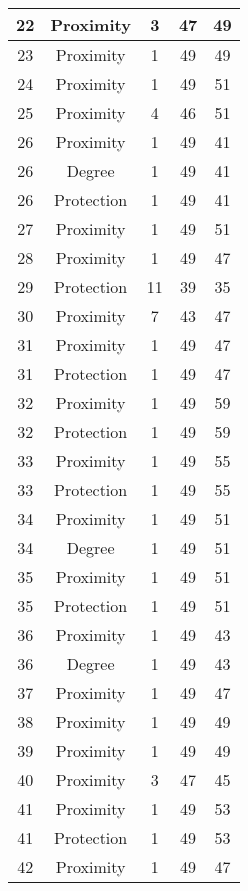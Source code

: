 \documentclass[results.tex]{subfiles}
\begin{document}
\begin{center}
\begin{tabular}{| c || c | c | c | c |}
    \hline
    22 & Proximity & 3 & 47 & 49 \\ 
    \hline
    23 & Proximity & 1 & 49 & 49 \\ 
    \hline
    24 & Proximity & 1 & 49 & 51 \\ 
    \hline
    25 & Proximity & 4 & 46 & 51 \\ 
    \hline
    26 & Proximity & 1 & 49 & 41 \\ 
    \hline
    26 & Degree & 1 & 49 & 41 \\ 
    \hline
    26 & Protection & 1 & 49 & 41 \\ 
    \hline
    27 & Proximity & 1 & 49 & 51 \\ 
    \hline
    28 & Proximity & 1 & 49 & 47 \\ 
    \hline
    29 & Protection & 11 & 39 & 35 \\ 
    \hline
    30 & Proximity & 7 & 43 & 47 \\ 
    \hline
    31 & Proximity & 1 & 49 & 47 \\ 
    \hline
    31 & Protection & 1 & 49 & 47 \\ 
    \hline
    32 & Proximity & 1 & 49 & 59 \\ 
    \hline
    32 & Protection & 1 & 49 & 59 \\ 
    \hline
    33 & Proximity & 1 & 49 & 55 \\ 
    \hline
    33 & Protection & 1 & 49 & 55 \\ 
    \hline
    34 & Proximity & 1 & 49 & 51 \\ 
    \hline
    34 & Degree & 1 & 49 & 51 \\ 
    \hline
    35 & Proximity & 1 & 49 & 51 \\ 
    \hline
    35 & Protection & 1 & 49 & 51 \\ 
    \hline
    36 & Proximity & 1 & 49 & 43 \\ 
    \hline
    36 & Degree & 1 & 49 & 43 \\ 
    \hline
    37 & Proximity & 1 & 49 & 47 \\ 
    \hline
    38 & Proximity & 1 & 49 & 49 \\ 
    \hline
    39 & Proximity & 1 & 49 & 49 \\ 
    \hline
    40 & Proximity & 3 & 47 & 45 \\ 
    \hline
    41 & Proximity & 1 & 49 & 53 \\ 
    \hline
    41 & Protection & 1 & 49 & 53 \\ 
    \hline
    42 & Proximity & 1 & 49 & 47 \\ 

\end{tabular}
\end{center}
\end{document}
